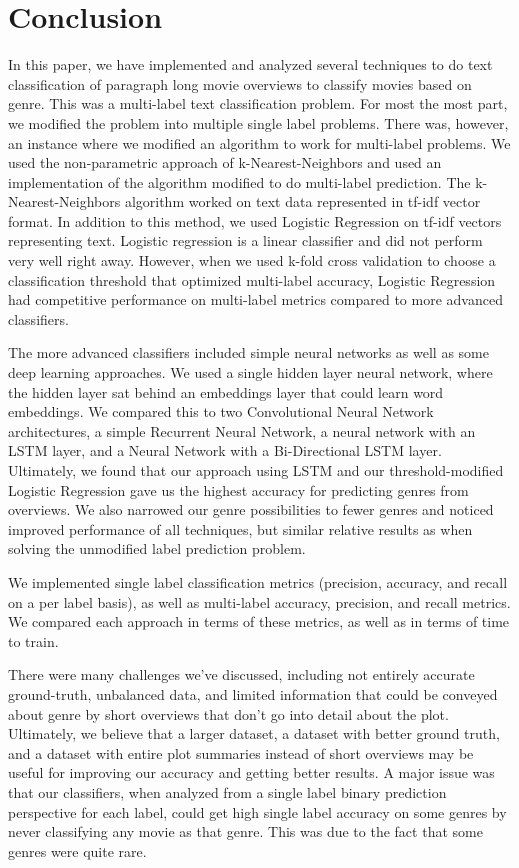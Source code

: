 \documentclass[sigconf]{acmart}
\begin{document}
\section{Conclusion}
In this paper, we have implemented and analyzed several techniques to do text classification of paragraph long movie overviews to classify movies based on genre. This was a multi-label text classification problem. For most the most part, we modified the problem into multiple single label problems. There was, however, an instance where we modified an algorithm to work for multi-label problems. We used the non-parametric approach of k-Nearest-Neighbors and used an implementation of the algorithm modified to do multi-label prediction. The k-Nearest-Neighbors algorithm worked on text data represented in tf-idf vector format. In addition to this method, we used Logistic Regression on tf-idf vectors representing text.  Logistic regression is a linear classifier and did not perform very well right away.  However, when we used k-fold cross validation to choose a classification threshold that optimized multi-label accuracy, Logistic Regression had competitive performance on multi-label metrics compared to more advanced classifiers. 

The more advanced classifiers included simple neural networks as well as some deep learning approaches. We used a single hidden layer neural network, where the hidden layer sat behind an embeddings layer that could learn word embeddings.  We compared this to two Convolutional Neural Network architectures, a simple Recurrent Neural Network, a neural network with an LSTM layer, and a Neural Network with a Bi-Directional LSTM layer. Ultimately, we found that our approach using LSTM and our threshold-modified Logistic Regression gave us the highest accuracy for predicting genres from overviews. We also narrowed our genre possibilities to fewer genres and noticed improved performance of all techniques, but similar relative results as when solving the unmodified label prediction problem. 

We implemented single label classification metrics (precision, accuracy, and recall on a per label basis), as well as multi-label accuracy, precision, and recall metrics. We compared each approach in terms of these metrics, as well as in terms of time to train.

There were many challenges we've discussed, including not entirely accurate ground-truth, unbalanced data, and limited information that could be conveyed about genre by short overviews that don't go into detail about the plot. Ultimately, we believe that a larger dataset, a dataset with better ground truth, and a dataset with entire plot summaries instead of short overviews may be useful for improving our accuracy and getting better results. A major issue was that our classifiers, when analyzed from a single label binary prediction perspective for each label, could get high single label accuracy on some genres by never classifying any movie as that genre.  This was due to the fact that some genres were quite rare.
\end{document}
